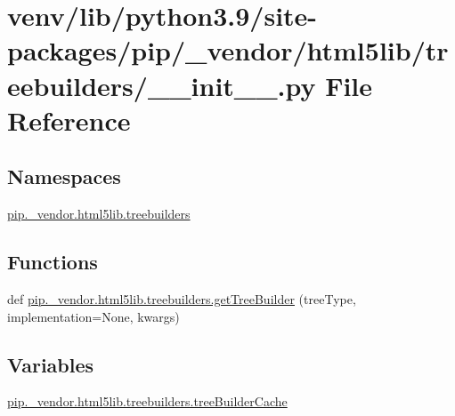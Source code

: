\hypertarget{venv_2lib_2python3_89_2site-packages_2pip_2__vendor_2html5lib_2treebuilders_2____init_____8py}{}\section{venv/lib/python3.9/site-\/packages/pip/\+\_\+vendor/html5lib/treebuilders/\+\_\+\+\_\+init\+\_\+\+\_\+.py File Reference}
\label{venv_2lib_2python3_89_2site-packages_2pip_2__vendor_2html5lib_2treebuilders_2____init_____8py}
\subsection*{Namespaces}
\begin{DoxyCompactItemize}
\item 
 \hyperlink{namespacepip_1_1__vendor_1_1html5lib_1_1treebuilders}{pip.\+\_\+vendor.\+html5lib.\+treebuilders}
\end{DoxyCompactItemize}
\subsection*{Functions}
\begin{DoxyCompactItemize}
\item 
def \hyperlink{namespacepip_1_1__vendor_1_1html5lib_1_1treebuilders_a127aeb9dfbb8079a4ec65284e191d81c}{pip.\+\_\+vendor.\+html5lib.\+treebuilders.\+get\+Tree\+Builder} (tree\+Type, implementation=None, kwargs)
\end{DoxyCompactItemize}
\subsection*{Variables}
\begin{DoxyCompactItemize}
\item 
\hyperlink{namespacepip_1_1__vendor_1_1html5lib_1_1treebuilders_af20116ca2f6a2765396a54f21e84261e}{pip.\+\_\+vendor.\+html5lib.\+treebuilders.\+tree\+Builder\+Cache}
\end{DoxyCompactItemize}
